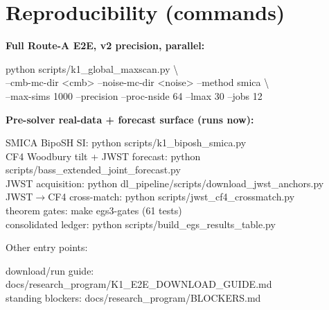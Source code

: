 \documentclass[11pt]{article}
\begin{document}
\appendix
\section{Reproducibility (commands)}

\noindent\textbf{Full Route-A E2E, v2 precision, parallel:}
\begin{flushleft}\footnotesize\ttfamily\raggedright
python scripts/k1\_global\_maxscan.py \textbackslash\\
\quad --cmb-mc-dir <cmb> --noise-mc-dir <noise> --method smica \textbackslash\\
\quad --max-sims 1000 --precision --proc-nside 64 --lmax 30 --jobs 12
\end{flushleft}

\noindent\textbf{Pre-solver real-data + forecast surface (runs now):}
\begin{flushleft}\footnotesize\ttfamily\raggedright
SMICA BipoSH SI: python scripts/k1\_biposh\_smica.py\\
CF4 Woodbury tilt + JWST forecast: python scripts/bass\_extended\_joint\_forecast.py\\
JWST acquisition: python dl\_pipeline/scripts/download\_jwst\_anchors.py\\
JWST$\to$CF4 cross-match: python scripts/jwst\_cf4\_crossmatch.py\\
theorem gates: make egs3-gates \quad(61 tests)\\
consolidated ledger: python scripts/build\_egs\_results\_table.py
\end{flushleft}

\noindent Other entry points:
\begin{flushleft}\footnotesize\ttfamily\raggedright
download/run guide: docs/research\_program/K1\_E2E\_DOWNLOAD\_GUIDE.md\\
standing blockers: docs/research\_program/BLOCKERS.md
\end{flushleft}
\end{document}
